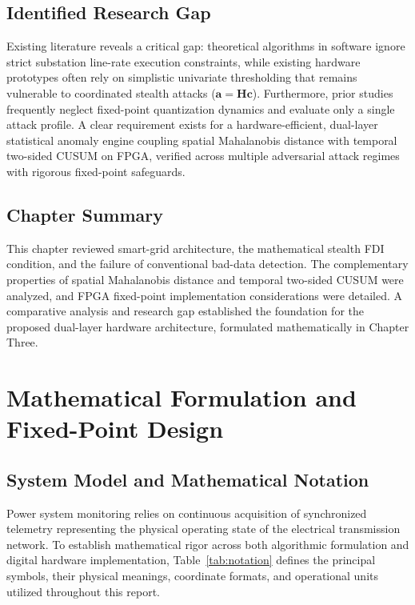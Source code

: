 \documentclass[11pt,a4paper]{report}
\begin{document}
\section{Identified Research Gap}
Existing literature reveals a critical gap: theoretical algorithms in software ignore strict
substation line-rate execution constraints, while existing hardware prototypes often rely on
simplistic univariate thresholding that remains vulnerable to coordinated stealth attacks ($\boldsymbol{a} = \boldsymbol{H}\boldsymbol{c}$).
Furthermore, prior studies frequently neglect fixed-point quantization dynamics and evaluate only a
single attack profile. A clear requirement exists for a hardware-efficient, dual-layer statistical
anomaly engine coupling spatial Mahalanobis distance with temporal two-sided CUSUM on FPGA, verified
across multiple adversarial attack regimes with rigorous fixed-point safeguards.

\section{Chapter Summary}
This chapter reviewed smart-grid architecture, the mathematical stealth FDI condition, and the
failure of conventional bad-data detection. The complementary properties of spatial Mahalanobis
distance and temporal two-sided CUSUM were analyzed, and FPGA fixed-point implementation considerations
were detailed. A comparative analysis and research gap established the foundation for the proposed
dual-layer hardware architecture, formulated mathematically in Chapter Three.


\chapter{Mathematical Formulation and Fixed-Point Design}

\section{System Model and Mathematical Notation}
Power system monitoring relies on continuous acquisition of synchronized telemetry
representing the physical operating state of the electrical transmission network.
To establish mathematical rigor across both algorithmic formulation and digital
hardware implementation, Table~\ref{tab:notation} defines the principal symbols,
their physical meanings, coordinate formats, and operational units utilized
throughout this report.
\end{document}
